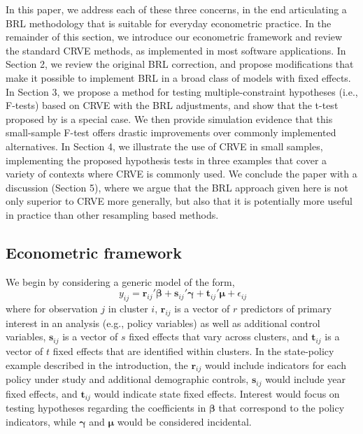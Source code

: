 \documentclass[12pt]{article}\usepackage[]{graphicx}\usepackage[]{color}
\newcommand{\bm}{\mathbf}
\newcommand{\bs}{\boldsymbol}
\begin{document}

In this paper, we address each of these three concerns, in the end articulating a BRL methodology that is suitable for everyday econometric practice. 
In the remainder of this section, we introduce our econometric framework and review the standard CRVE methods, as implemented in most software applications. 
In Section 2, we review the original BRL correction, and propose modifications that make it possible to implement BRL in a broad class of models with fixed effects.
In Section 3, we propose a method for testing multiple-constraint hypotheses (i.e., F-tests) based on CRVE with the BRL adjustments, and show that the t-test proposed by \citet{Bell2002bias} is a special case. 
We then provide simulation evidence that this small-sample F-test offers drastic improvements over commonly implemented alternatives.
In Section 4, we illustrate the use of CRVE in small samples, implementing the proposed hypothesis tests in three examples that cover a variety of contexts where CRVE is commonly used. 
We conclude the paper with a discussion (Section 5), where we argue that the BRL approach given here is not only superior to CRVE more generally, but also that it is potentially more useful in practice than other resampling based methods. 


\subsection{Econometric framework}

We begin by considering a generic model of the form,
\begin{equation}
\label{eq:fixed_effects_ij}
\ {y}_{ij} = \bm{r}_{ij}' \bs\beta + \bm{s}_{ij}' \bs\gamma + \bm{t}_{ij}' \bs\mu + \epsilon_{ij} 
\end{equation}
where for observation $j$ in cluster $i$, $\bm{r}_{ij}$ is a vector of $r$ predictors of primary interest in an analysis (e.g., policy variables) as well as additional control variables, $\bm{s}_{ij}$ is a vector of $s$ fixed effects that vary across clusters, and $\bm{t}_{ij}$ is a vector of $t$ fixed effects that are identified within clusters. In the state-policy example described in the introduction, the $\bm{r}_{ij}$ would include indicators for each policy under study and additional demographic controls, $\bm{s}_{ij}$ would include year fixed effects, and $\bm{t}_{ij}$ would indicate state fixed effects. Interest would focus on testing hypotheses regarding the coefficients in $\bs\beta$ that correspond to the policy indicators, while $\bs\gamma$ and $\bs\mu$ would be considered incidental. 
\end{document}

